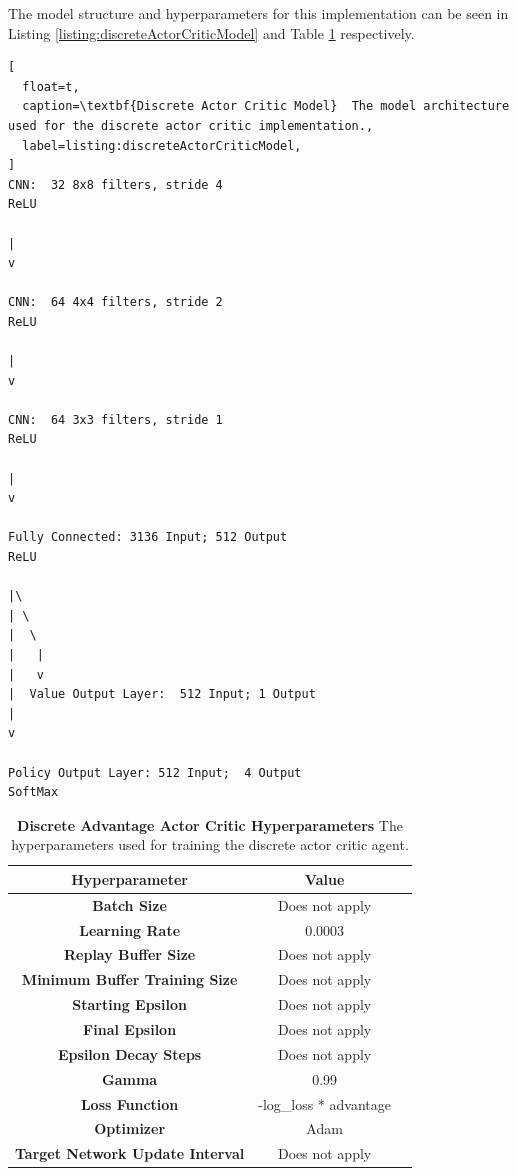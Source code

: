 \documentclass[conference]{IEEEtran}
\begin{document}
The model structure and hyperparameters for this implementation can be seen in Listing \ref{listing:discreteActorCriticModel} and Table \ref{table:discreteActorCriticHypers} respectively.

\begin{lstlisting}[
  float=t,
  caption=\textbf{Discrete Actor Critic Model}  The model architecture used for the discrete actor critic implementation.,
  label=listing:discreteActorCriticModel,
]
CNN:  32 8x8 filters, stride 4
ReLU

|
v

CNN:  64 4x4 filters, stride 2
ReLU

|
v

CNN:  64 3x3 filters, stride 1
ReLU

|
v

Fully Connected: 3136 Input; 512 Output
ReLU

|\
| \
|  \
|   |
|   v
|  Value Output Layer:  512 Input; 1 Output
|
v

Policy Output Layer: 512 Input;  4 Output
SoftMax
\end{lstlisting}

\begin{table}[htbp]
    \caption{\textbf{Discrete Advantage Actor Critic Hyperparameters}  The hyperparameters used for training the discrete actor critic agent.}
\begin{center}
\begin{tabular}{|c|c|c|}
\hline
\textbf{Hyperparameter} & \textbf{Value} \\
\hline
\textbf{Batch Size} & Does not apply \\
\hline
\textbf{Learning Rate} & 0.0003\\
\hline
\textbf{Replay Buffer Size} & Does not apply \\
\hline
\textbf{Minimum Buffer Training Size} & Does not apply \\
\hline
\textbf{Starting Epsilon} & Does not apply \\
\hline
\textbf{Final Epsilon} & Does not apply \\
\hline
\textbf{Epsilon Decay Steps} & Does not apply \\
\hline
\textbf{Gamma} & 0.99\\
\hline
\textbf{Loss Function} &  -log\_loss * advantage \\
\hline
\textbf{Optimizer} & Adam \\
\hline
\textbf{Target Network Update Interval} & Does not apply \\
\hline
\end{tabular}
\label{table:discreteActorCriticHypers}
\end{center}
\end{table}
\end{document}
